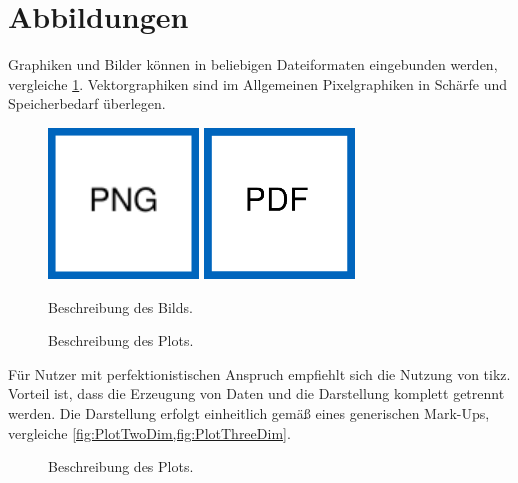 \section{Abbildungen}
Graphiken und Bilder können in beliebigen Dateiformaten eingebunden werden, vergleiche \cref{fig:MyImage}. Vektorgraphiken sind im Allgemeinen Pixelgraphiken in Schärfe und Speicherbedarf überlegen.\par%
%
\begin{figure}[htb]%
    \centering%
    \includegraphics[width=40mm]{figures/ImagePNG.png}%
    \hspace*{5mm}%
    \includegraphics[width=40mm]{figures/ImagePDF.pdf}\par%
    \begingroup%
        \resizebox{40mm}{!}{}%
    \endgroup%
    \hspace*{5mm}%
    \begingroup%
        \def\svgwidth{40mm}%
        \fontsize{25}{25}\selectfont%
    \endgroup%
    \caption{Beschreibung des Bilds.\label{fig:MyImage}}%
\end{figure}%
%
\begin{figure}[htb]%
    \centering%
    \caption{Beschreibung des Plots.\label{fig:PlotTwoDim}}%
\end{figure}%
%
Für Nutzer mit perfektionistischen Anspruch empfiehlt sich die Nutzung von \gls{tikz}. Vorteil ist, dass die Erzeugung von Daten und die Darstellung komplett getrennt werden. Die Darstellung erfolgt einheitlich gemäß eines generischen Mark-Ups, vergleiche \cref{fig:PlotTwoDim,fig:PlotThreeDim}.\par%
%
\begin{figure}[htb]%
    \centering%
    \caption{Beschreibung des Plots.\label{fig:PlotThreeDim}}%
\end{figure}%
%
%

